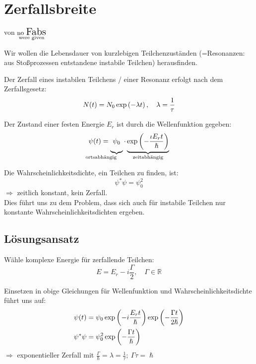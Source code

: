 \documentclass[Ex4_Zusammenfassung.tex]{subfiles}
\begin{document}
\section{Zerfallsbreite}
von \textbf{$\mathop{\text{\small{no} \Large Fabs}}\limits_{\text{were given}}$}

Wir wollen die Lebensdauer von kurzlebigen Teilchenzuständen (=Resonanzen: aus Stoßprozessen entstandene instabile Teilchen) herausfinden.

Der Zerfall eines instabilen Teilchens / einer Resonanz erfolgt nach dem Zerfallsgesetz:
\begin{equation}
	N(t) = N_0 \exp \left( - \lambda t \right), \quad \lambda = \frac{1}{\tau}
\end{equation}

Der Zustand einer festen Energie $E_r$ ist durch die Wellenfunktion gegeben:
\begin{equation}
	\psi(t) = \underbrace{ \vphantom{\lp - \frac{i E_r t}{\hslash} \rp} \psi_0}_{\mathllap{\text{ortsabhängig}}} \cdot \underbrace{\exp \lp - \frac{\iota E_r t}{\hslash} \rp}_{\mathclap{\text{zeitabhängig}}}
\end{equation}

Die Wahrscheinlichkeitsdichte, ein Teilchen zu finden, ist:
\begin{equation}
	\psi^* \psi = \psi_0^2
\end{equation}
$\Rightarrow$ zeitlich konstant, kein Zerfall.\\
Dies führt uns zu dem Problem, dass sich auch für instabile Teilchen nur konstante Wahrscheinlichkeitsdichten ergeben.

\subsection{Lösungsansatz}
Wähle komplexe Energie für zerfallende Teilchen:
\begin{equation}
	E = E_r - i \frac{\Gamma}{2}, \quad \Gamma \in \mathbb{R}
\end{equation}

Einsetzen in obige Gleichungen für Wellenfunktion und Wahrscheinlichkeitsdichte führt uns auf:
\begin{align}
	\psi(t) &= \psi_0 \exp \left( -i \frac{E_r t}{\hslash}\right) \exp \left( -\frac{\Gamma t}{2 \hslash} \right)\\
	\psi^* \psi &= \psi_0^2 \exp \left( -\frac{\Gamma t}{\hslash}  \right)
\end{align}
$\Rightarrow$ exponentieller Zerfall mit $\frac{\Gamma}{\hslash} = \lambda = \frac{1}{\tau};\ \Gamma \tau = \hslash$\\
\end{document}
